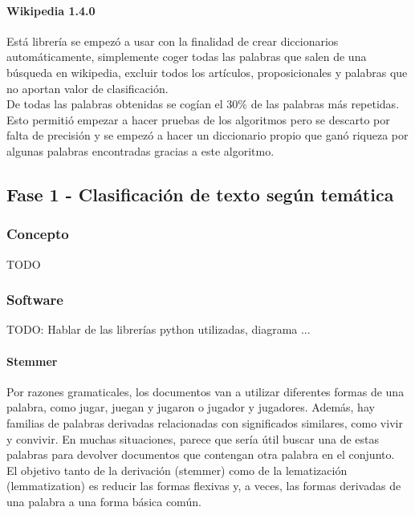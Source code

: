 \documentclass[../all.tex]{subfiles}
\begin{document}
        \paragraph{Wikipedia 1.4.0}
            Está librería se empezó a usar con la finalidad de crear diccionarios automáticamente, simplemente coger todas las palabras que salen de una búsqueda en wikipedia, excluir todos los artículos, proposicionales y palabras que no aportan valor de clasificación.\\
            
            De todas las palabras obtenidas se cogían el 30\% de las palabras más repetidas. Esto permitió empezar a hacer pruebas de los algoritmos pero se descarto por falta de precisión y se empezó a hacer un diccionario propio que ganó riqueza por algunas palabras encontradas gracias a este algoritmo.
            

\newpage    
\subsection{Fase 1 - Clasificación de texto según temática}
    \subsubsection{Concepto}
    	
        {\color{red} 
            TODO
        }
    \subsubsection{Software}
        {\color{red} 
        TODO: Hablar de las librerías python utilizadas, diagrama ...
        }
    
    	\newpage
        \paragraph{Stemmer}
        	Por razones gramaticales, los documentos van a utilizar diferentes formas de una palabra, como jugar, juegan y jugaron o jugador y jugadores. Además, hay familias de palabras derivadas relacionadas con significados similares, como vivir y convivir. En muchas situaciones, parece que sería útil buscar una de estas palabras para devolver documentos que contengan otra palabra en el conjunto.\\
        	
        	El objetivo tanto de la derivación (stemmer) como de la lematización (lemmatization) es reducir las formas flexivas y, a veces, las formas derivadas de una palabra a una forma básica común.\\
        	
\end{document}
